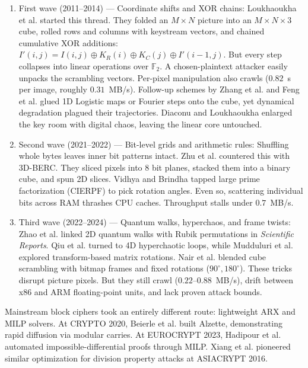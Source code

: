 \documentclass[10pt,twocolumn]{article}
\begin{document}
\begin{enumerate}
    \item First wave (2011--2014) --- Coordinate shifts and XOR chains: Loukhaoukha et al. \cite{loukhaoukha2012rubik} started this thread. They folded an $M \times N$ picture into an $M \times N \times 3$ cube, rolled rows and columns with keystream vectors, and chained cumulative XOR additions: $I'(i, j) = I(i, j) \oplus K_R(i) \oplus K_C(j) \oplus I'(i-1, j)$. But every step collapses into linear operations over $\mathbb{F}_2$. A chosen-plaintext attacker easily unpacks the scrambling vectors. Per-pixel manipulation also crawls ($0.82$~s per image, roughly $0.31$~MB/s). Follow-up schemes by Zhang et al. \cite{zhang2011rubik} and Feng et al. \cite{feng2011cisp} glued 1D Logistic maps or Fourier steps onto the cube, yet dynamical degradation plagued their trajectories. Diaconu and Loukhaoukha \cite{diaconu2013rubik} enlarged the key room with digital chaos, leaving the linear core untouched.
    \item Second wave (2021--2022) --- Bit-level grids and arithmetic rules: Shuffling whole bytes leaves inner bit patterns intact. Zhu et al. \cite{zhu2021berc} countered this with 3D-BERC. They sliced pixels into 8 bit planes, stacked them into a binary cube, and spun 2D slices. Vidhya and Brindha \cite{vidhya2022cierpf} tapped large prime factorization (CIERPF) to pick rotation angles. Even so, scattering individual bits across RAM thrashes CPU caches. Throughput stalls under $0.7$~MB/s.
    \item Third wave (2022--2024) --- Quantum walks, hyperchaos, and frame twists: Zhao et al. \cite{zhao2022quantum} linked 2D quantum walks with Rubik permutations in \textit{Scientific Reports}. Qiu et al. \cite{qiu2022hyperchaotic} turned to 4D hyperchaotic loops, while Mudduluri et al. \cite{mudduluri2022rubik} explored transform-based matrix rotations. Nair et al. \cite{nair2024rubik} blended cube scrambling with bitmap frames and fixed rotations ($90^\circ, 180^\circ$). These tricks disrupt picture pixels. But they still crawl ($0.22$--$0.88$~MB/s), drift between x86 and ARM floating-point units, and lack proven attack bounds.
\end{enumerate}

Mainstream block ciphers took an entirely different route: lightweight ARX and MILP solvers. At CRYPTO 2020, Beierle et al. \cite{beierle2020alzette} built Alzette, demonstrating rapid diffusion via modular carries. At EUROCRYPT 2023, Hadipour et al. \cite{hadipour2023impossible} automated impossible-differential proofs through MILP. Xiang et al. \cite{xiang2016milp} pioneered similar optimization for division property attacks at ASIACRYPT 2016.
\end{document}
